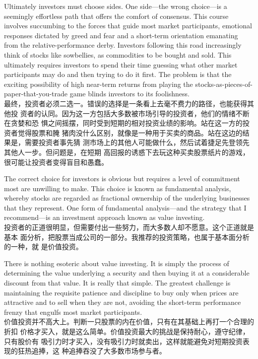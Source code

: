 \begin{verseparallel}
  {
    Ultimately investors must choose sides. One side—the wrong choice—is a
    seemingly effortless path that offers the comfort of consensus. This course
    involves succumbing to the forces that guide most market participants,
    emotional responses dictated by greed and fear and a short-term orientation
    emanating from the relative-performance derby. Investors following this road
    increasingly think of stocks like sowbellies, as commodities to be bought
    and sold. This ultimately requires investors to spend their time guessing
    what other market participants may do and then trying to do it first. The
    problem is that the exciting possibility of high near-term returns from
    playing the stocks-as-pieces-of-paper-that-you-trade game blinds investors
    to its foolishness. \\
  }
  {
    最终，投资者必须二选一。错误的选择是一条看上去毫不费力的路径，也能获得其他投
    资者的认同。因为这一方包括大多数被市场引导的投资者，他们的情绪不断在贪婪和恐
    惧之间摇摆，同时受到短期的相对投资业绩的影响。站在这一方的投资者觉得股票和腌
    猪肉没什么区别，就像是一种用于买卖的商品。站在这边的结果是，需要投资者事先猜
    测市场上的其他人可能做什么，然后试着捷足先登领先其他人一步。但问题是，在短期
    高回报的诱惑下去玩这种买卖股票纸片的游戏，很可能让投资者变得盲目和愚蠢。
  }
\end{verseparallel}

\begin{verseparallel}
  {
    The correct choice for investors is obvious but requires a level of
    commitment most are unwilling to make. This choice is known as fundamental
    analysis, whereby stocks are regarded as fractional ownership of the
    underlying businesses that they represent. One form of fundamental
    analysis—and the strategy that I recommend—is an investment approach known
    as value investing. \\
  }
  {
    投资者的正道很明显，但需要付出一些努力，而大多数人却不愿意。这个正道就是基本
    面分析，把股票当成公司的一部分。我推荐的投资策略，也属于基本面分析的一种，就
    是价值投资。
  }
\end{verseparallel}

\begin{verseparallel}
  {
    There is nothing esoteric about value investing. It is simply the process of
    determining the value underlying a security and then buying it at a
    considerable discount from that value. It is really that simple. The
    greatest challenge is maintaining the requisite patience and discipline to
    buy only when prices are attractive and to sell when they are not, avoiding
    the short-term performance frenzy that engulfs most market participants. \\
  }
  {
    价值投资并不高大上。判断一只股票的内在价值，只有在其基础上再打一个合理的折扣
    价格才买入，就是这么简单。价值投资最大的挑战是保持耐心，遵守纪律，只有股价有
    吸引力时才买入，没有吸引力时就卖出，这样就能避免对短期投资表现的狂热追捧，这
    种追捧吞没了大多数市场参与者。
  }
\end{verseparallel}

